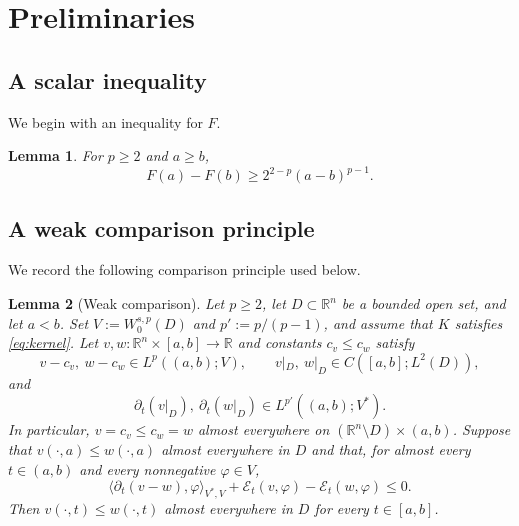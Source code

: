 \documentclass[10pt]{amsart}
\theoremstyle{plain}
\newtheorem{lemma}{Lemma}[section]
\theoremstyle{definition}
\theoremstyle{remark}
\numberwithin{equation}{section}
\newcommand{\R}{\mathbb R}
\begin{document}

\section{Preliminaries}

\subsection{A scalar inequality}

We begin with an inequality for $F$.

\begin{lemma}\label{lem:scalar}
For $p\ge2$ and $a\ge b$,
\begin{equation}\label{eq:scalar}
F(a)-F(b)
\ge
2^{2-p}(a-b)^{p-1}.
\end{equation}
\end{lemma}

\subsection{A weak comparison principle}

We record the following comparison principle used below. 

\begin{lemma}[Weak comparison]\label{lem:weak-comparison}
Let $p\ge2$, let $D\subset\R^n$ be a bounded open set, and let
$a<b$. Set $V:=W^{s,p}_0(D)$ and $p':=p/(p-1)$, and assume that
$K$ satisfies \eqref{eq:kernel}. Let $v,w:\R^n\times[a,b]\to\R$
and constants $c_v\le c_w$ satisfy
\[
v-c_v,\ w-c_w\in L^p((a,b);V),
\qquad
v|_D,\ w|_D\in C([a,b];L^2(D)),
\]
and
\[
\partial_t(v|_D),\ \partial_t(w|_D)
\in L^{p'}((a,b);V^*).
\]
In particular, $v=c_v\le c_w=w$ almost everywhere on
$(\R^n\setminus D)\times(a,b)$.
Suppose that $v(\cdot,a)\le w(\cdot,a)$ almost everywhere in $D$ and
that, for almost every $t\in(a,b)$ and every nonnegative $\varphi\in V$,
\begin{equation}\label{eq:weak-comparison-assumption}
\langle\partial_t(v-w),\varphi\rangle_{V^*,V}
+\mathcal E_t(v,\varphi)-\mathcal E_t(w,\varphi)\le0.
\end{equation}
Then $v(\cdot,t)\le w(\cdot,t)$ almost everywhere in $D$ for every
$t\in[a,b]$.
\end{lemma}
\end{document}
